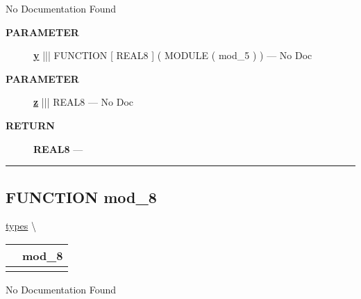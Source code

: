 \par





No Documentation Found






\par
\begin{description}
\item [\colorbox{tagtype}{\color{white} \textbf{\textsf{PARAMETER}}}] \textbf{\underline{y}} ||| FUNCTION [ REAL8 ] ( MODULE ( mod\_5 ) ) --- No Doc
\item [\colorbox{tagtype}{\color{white} \textbf{\textsf{PARAMETER}}}] \textbf{\underline{z}} ||| REAL8 --- No Doc
\end{description}







\par
\begin{description}
\item [\colorbox{tagtype}{\color{white} \textbf{\textsf{RETURN}}}] \textbf{REAL8} --- 
\end{description}




\rule{\linewidth}{0.5pt}
\subsection*{\textsf{\colorbox{headtoc}{\color{white} FUNCTION}
mod\_8}}

\hypertarget{ecldoc:types.mod_8}{}
\hspace{0pt} \hyperlink{ecldoc:types}{types} \textbackslash 

{\renewcommand{\arraystretch}{1.5}
\begin{tabularx}{\textwidth}{|>{\raggedright\arraybackslash}l|X|}
\hline
\hspace{0pt}\mytexttt{\color{red} } & \textbf{mod\_8} \\
\hline
\multicolumn{2}{|>{\raggedright\arraybackslash}X|}{\hspace{0pt}\mytexttt{\color{param} (mod\_3 a1)}} \\
\hline
\end{tabularx}
}

\par





No Documentation Found







